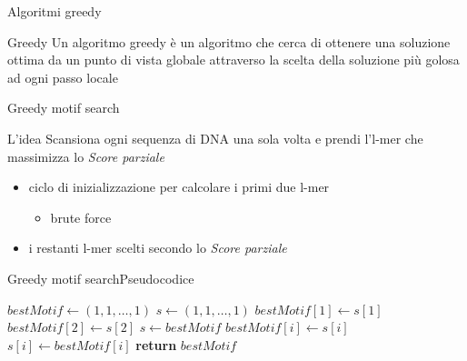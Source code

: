 	\begin{frame}{Algoritmi greedy}
		\begin{block}{Greedy}
			Un algoritmo greedy è un algoritmo che cerca di ottenere una soluzione ottima da un punto di vista globale attraverso la scelta della soluzione più golosa ad ogni passo locale
		\end{block}
	\end{frame}
	
	\begin{frame}{Greedy motif search}
		\begin{block}{L'idea}
			Scansiona ogni sequenza di DNA una sola volta e prendi l'l-mer che massimizza lo \textit{Score parziale}
		\end{block}
		\begin{itemize}
			\item ciclo di inizializzazione per calcolare i primi due l-mer
			\begin{itemize}
				\item brute force
			\end{itemize}
			\item i restanti l-mer scelti secondo lo \textit{Score parziale}
		\end{itemize}
	\end{frame}
	
	\begin{frame}{Greedy motif search}{Pseudocodice}
		\begin{center}\scriptsize
			\begin{minipage}{8.6cm}
			    \begin{algorithmic}[1]
				    	\State $bestMotif\gets (1,1,\dots,1)$
					    \State $s\gets (1,1,\dots,1)$
					    			\State $bestMotif[1]\gets s[1]$
					    			\State $bestMotif[2]\gets s[2]$
					    		\EndIf
					    	\EndFor
					    \EndFor
					    \State $s\gets bestMotif$
					    			\State $bestMotif[i]\gets s[i]$
					    		\EndIf
					    	\EndFor
					    	\State $s[i]\gets bestMotif[i]$
					    \EndFor
					    \State \textbf{return} $bestMotif$
				    \EndProcedure
			    \end{algorithmic}
			\end{minipage}
	    \end{center}
	\end{frame}
	
